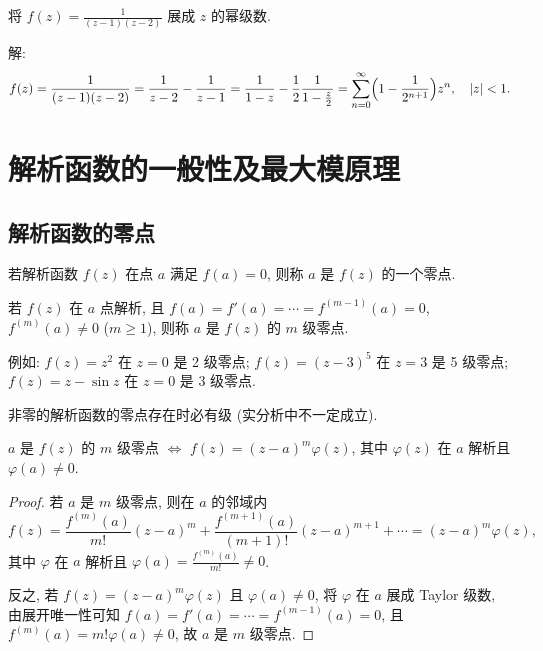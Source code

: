 \documentclass[theorem=false,mathfont=none,openany,sub3section]{easybook}
\begin{document}
\begin{example}
  将 $f(z)=\frac{1}{(z-1)(z-2)}$ 展成 $z$ 的幂级数.\par
  解:
  \[
  f(z)=\frac{1}{(z-1)(z-2)}=\frac{1}{z-2}-\frac{1}{z-1}
  =\frac{1}{1-z}-\frac{1}{2}\frac{1}{1-\frac{z}{2}}
  =\sum_{n=0}^{\infty}\Bigl(1-\frac{1}{2^{n+1}}\Bigr)z^{n},\quad|z|<1.
  \]
\end{example}

\newpage

\section{解析函数的一般性及最大模原理}

\subsection{解析函数的零点}

\begin{definition}
  若解析函数 $f(z)$ 在点 $a$ 满足 $f(a)=0$, 则称 $a$ 是 $f(z)$ 的一个零点.
\end{definition}

\begin{definition}
  若 $f(z)$ 在 $a$ 点解析, 且 $f(a)=f'(a)=\cdots=f^{(m-1)}(a)=0$, $f^{(m)}(a)\neq0$ ($m\geq1$), 则称 $a$ 是 $f(z)$ 的 $m$ 级零点.
\end{definition}

例如: $f(z)=z^{2}$ 在 $z=0$ 是 2 级零点; $f(z)=(z-3)^{5}$ 在 $z=3$ 是 5 级零点; $f(z)=z-\sin z$ 在 $z=0$ 是 3 级零点.

\begin{remark}
  非零的解析函数的零点存在时必有级 (实分析中不一定成立).
\end{remark}

\begin{theorem}
  $a$ 是 $f(z)$ 的 $m$ 级零点 $\Leftrightarrow$ $f(z)=(z-a)^{m}\varphi(z)$, 其中 $\varphi(z)$ 在 $a$ 解析且 $\varphi(a)\neq0$.
\end{theorem}

\begin{proof}
  若 $a$ 是 $m$ 级零点, 则在 $a$ 的邻域内
  \[
  f(z)=\frac{f^{(m)}(a)}{m!}(z-a)^{m}+\frac{f^{(m+1)}(a)}{(m+1)!}(z-a)^{m+1}+\cdots
  =(z-a)^{m}\varphi(z),
  \]
  其中 $\varphi$ 在 $a$ 解析且 $\varphi(a)=\frac{f^{(m)}(a)}{m!}\neq0$.

  反之, 若 $f(z)=(z-a)^{m}\varphi(z)$ 且 $\varphi(a)\neq0$, 将 $\varphi$ 在 $a$ 展成 Taylor 级数, 由展开唯一性可知
  $f(a)=f'(a)=\cdots=f^{(m-1)}(a)=0$, 且 $f^{(m)}(a)=m!\varphi(a)\neq0$, 故 $a$ 是 $m$ 级零点.
\end{proof}
\end{document}
